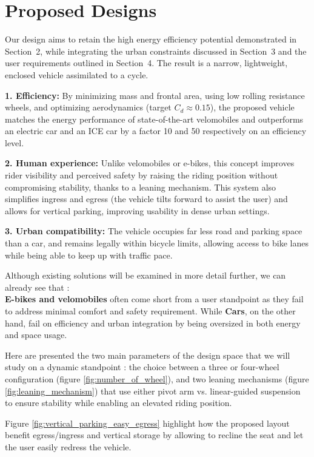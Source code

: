 \section{Proposed Designs}
Our design aims to retain the high energy efficiency potential demonstrated in Section~2, while integrating the urban constraints discussed in Section~3 and the user requirements outlined in Section~4. The result is a narrow, lightweight, enclosed vehicle assimilated to a cycle.

\textbf{1. Efficiency:}  
By minimizing mass and frontal area, using low rolling resistance wheels, and optimizing aerodynamics (target $C_d \approx 0.15$), the proposed vehicle matches the energy performance of state-of-the-art velomobiles and outperforms an electric car and an ICE car by a factor 10 and 50 respectively on an efficiency level.

\textbf{2. Human experience:}  
Unlike velomobiles or e-bikes, this concept improves rider visibility and perceived safety by raising the riding position without compromising stability, thanks to a leaning mechanism. This system also simplifies ingress and egress (the vehicle tilts forward to assist the user) and allows for vertical parking, improving usability in dense urban settings.

\textbf{3. Urban compatibility:}  
The vehicle occupies far less road and parking space than a car, and remains legally within bicycle limits, allowing access to bike lanes while being able to keep up with traffic pace.

\vspace{0.3em}

Although existing solutions will be examined in more detail further, we can already see that :  \\
\textbf{E-bikes and velomobiles} often come short from a user standpoint as they fail to address minimal comfort and safety requirement.
While \textbf{Cars}, on the other hand, fail on efficiency and urban integration by being oversized in both energy and space usage.

Here are presented the two main parameters of the design space that we will study on a dynamic standpoint : the choice between a three or four-wheel configuration (figure \ref{fig:number_of_wheel}), and two leaning mechanisms (figure \ref{fig:leaning_mechanism}) that use either pivot arm vs. linear-guided suspension to ensure stability while enabling an elevated riding position. 

Figure \ref{fig:vertical_parking_easy_egress} highlight how the proposed layout benefit egress/ingress and vertical storage by allowing to recline the seat and let the user easily redress the vehicle.


